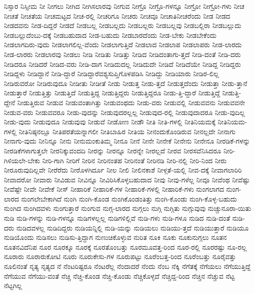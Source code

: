 {ನಿಸ್ಸಾರ
ನಿಸ್ಸೀಮ
ನೀ
ನೀಗಲು
ನೀಗಿದ
ನೀಗಿಸಲಾರವು
ನೀಗುವ
ನೀಗ್ರೊ
ನೀಗ್ರೊ-ಗಳನ್ನೂ
ನೀಗ್ರೋ
ನೀಗ್ರೋ-ಗಳು
ನೀಚ
ನೀಚತೆ
ನೀಚತೆಯ
ನೀಚಮಟ್ಟದ
ನೀಚ-ರಲ್ಲಿ
ನೀಚರಿಗೂ
ನೀಚರು
ನೀಚವೂ
ನೀಚಾತಿನೀಚರೆಂದು
ನೀಡ
ನೀಡದ
ನೀಡದವನು
ನೀಡ-ದಿದ್ದರೆ
ನೀಡದೆ
ನೀಡಬಲ್ಲ
ನೀಡಬಲ್ಲದು
ನೀಡಬಲ್ಲರು
ನೀಡಬಲ್ಲವು
ನೀಡಬಲ್ಲಿರಾ
ನೀಡಬಲ್ಲುದು
ನೀಡಬಲ್ಲುದೆಂಬು-ದಕ್ಕೆ
ನೀಡಬಹುದಾದ
ನೀಡ-ಬಹುದು
ನೀಡಬಾರದೆಂದು
ನೀಡ-ಬೇಕು
ನೀಡಬೇಕೆಂದು
ನೀಡಲಾಗದಿರು-ವುದು
ನೀಡಲಾಗಲಿಲ್ಲ-ವೆಂದು
ನೀಡಲಾಗುತ್ತಿದೆ
ನೀಡಲಾದ
ನೀಡಲಾಪ
ನೀಡಲಾಪರು
ನೀಡ-ಲಾರದು
ನೀಡ-ಲಾರರು
ನೀಡಲಾರವು
ನೀಡಲು
ನೀಡಿ
ನೀಡಿತು
ನೀಡಿತ್ತು
ನೀಡಿದ
ನೀಡಿದಂತಾಗು-ತ್ತದೆ
ನೀಡಿ-ದಂತೆ
ನೀಡಿ-ದರು
ನೀಡಿದರೂ
ನೀಡಿದರೆ
ನೀಡಿದ-ವರು
ನೀಡಿ-ದಾಗ
ನೀಡಿದುದಲ್ಲ
ನೀಡಿದುದೇ
ನೀಡಿದೆ
ನೀಡಿದೆಯೇ
ನೀಡಿದ್ದ
ನೀಡಿದ್ದರು
ನೀಡಿದ್ದಳು
ನೀಡಿದ್ದಾನೆ
ನೀಡಿ-ದ್ದಾರೆ
ನೀಡಿದ್ದಾರೆವಶ್ಯಸುಪ್ತಿಗೊಳಪಡಿಸಿ
ನೀಡಿದ್ದು
ನೀಡಿಯಾರು
ನೀಡಿರ-ಲಿಲ್ಲ
ನೀಡಿರುವರೋ
ನೀಡಿರುವುದೂ
ನೀಡೀತು
ನೀಡೀತೆ
ನೀಡು
ನೀಡುತ್ತ
ನೀಡು-ತ್ತದೆ
ನೀಡುತ್ತದೆಂದು
ನೀಡುತ್ತಾ
ನೀಡು-ತ್ತಾನೆ
ನೀಡುತ್ತಾರೆ
ನೀಡುತ್ತಿತ್ತು
ನೀಡುತ್ತಿದೆ
ನೀಡುತ್ತಿದ್ದ
ನೀಡುತ್ತಿದ್ದರು
ನೀಡುತ್ತಿದ್ದರೂ
ನೀಡು-ತ್ತಿ-ದ್ದಾರೆ
ನೀಡುತ್ತಿದ್ದೆ
ನೀಡುತ್ತಿ-ದ್ದೇನೆ
ನೀಡುತ್ತಿರುವ
ನೀಡುವ
ನೀಡುವಂತಾಗಿತ್ತು
ನೀಡುವಂಥದು
ನೀಡು-ವರು
ನೀಡುವಲ್ಲಿ
ನೀಡುವವನು
ನೀಡುವವನೇ
ನೀಡುವ-ವರು
ನೀಡುವವರೂ
ನೀಡು-ವುದನ್ನು
ನೀಡುವುದರಲ್ಲಲ್ಲ
ನೀಡುವುದ-ರಲ್ಲಿ
ನೀಡುವುದಾದರೂ
ನೀಡು-ವುದಿಲ್ಲ
ನೀಡು-ವುದು
ನೀಡುವುದೂ
ನೀಡುವುವು
ನೀಡುವೆ
ನೀಡೋಣ
ನೀಡೌ
ನೀತಿ
ನೀತಿ-ಗಳಲ್ಲಿ
ನೀತಿನಿಯಮಕ್ಕೆ
ನೀತಿನಿಯಮ-ಗಳಲ್ಲಿ
ನೀತಿನಿಷ್ಠನಲ್ಲೂ
ನೀತಿಪರತೆಯನ್ನಾಗಲೀ
ನೀತಿಬಾಹಿರ
ನೀತಿಯ
ನೀನಂದುಕೊಂಡಿರುವ
ನೀನಲ್ಲದೇ
ನೀನಾಗು
ನೀನಾಗು-ವುದು
ನೀನಿನ್ನೂ
ನೀನು
ನೀನುಮಂಕುತಿಮ್ಮ
ನೀನೂ
ನೀನೆ
ನೀನೇ
ನೀನೇಕೆ
ನೀನೇನು
ನೀನೇನೂ
ನೀರಡಿಕೆ-ಗಳನ್ನು
ನೀರಡಿಕೆಗಳಾಗುತ್ತಲೇ
ನೀರನಿಕ್ಕುವಂದದಿ
ನೀರನ್ನು
ನೀರನ್ನೂ
ನೀರನ್ನೇ
ನೀರಲ್ಲದೆ
ನೀರವ
ನೀರಸವೆನಿಸಿದರೂ
ನೀರಿ-ಗಿಳಿಯಲೇ-ಬೇಕು
ನೀರಿ-ಗಾಗಿ
ನೀರಿಗೆ
ನೀರಿನ
ನೀರಿನಂತಹ
ನೀರಿನಂತೆ
ನೀರಿನಡಿ
ನೀರಿ-ನಲ್ಲಿ
ನೀರಿ-ನಿಂದ
ನೀರು
ನೀರೂರುವುದಿಲ್ಲವೇ
ನೀರೆರೆದು
ನೀರೊಳಗಿರ್ದೂ
ನೀಲ
ನೀಲಿ
ನೀಲಿನಕಾಶೆ
ನೀಳ್ಗತೆ-ಯಲ್ಲಿ
ನೀವ-ದಕ್ಕೆ
ನೀವಾಗಲಾರಿರಿ
ನೀವಾದರೋ
ನೀವಾರು
ನೀವಿಡುವ
ನೀವಿನ್ನೂ
ನೀವಿರಿಸಿಕೊಳ್ಳಬಹುದಾದ
ನೀವು
ನೀವು-ಗಳೆಲ್ಲ
ನೀವೂ
ನೀವೆಂಥ
ನೀವೆಷ್ಟು
ನೀವೆಷ್ಟೇ
ನೀವೇ
ನೀವೇಕೆ
ನೀಸ್
ನೀಹಾರಿಕೆ
ನೀಹಾರಿಕೆ-ಗಳ
ನೀಹಾರಿಕೆ-ಗಳಲ್ಲಿ
ನೀಹಾರಿಕೆ-ಗಳು
ನುಂಗಲಾಗದ
ನುಂಗ-ಲಾರದ
ನುಂಗಲೇಬೇಕಾಗಿದೆ
ನುಂಗಿ
ನುಂಗಿ-ಕೊಂಡ
ನುಂಗಿಕೊಂಡಂತಿತ್ತು
ನುಂಗಿ-ಕೊಂಡು
ನುಂಗಿ-ಕೊಳ್ಳ-ಬಹುದು
ನುಂಗಿದ
ನುಂಗಿದವಳು
ನುಂಗುತ್ತಾರೆ
ನುಂಗುವ
ನುಗ್ಗ-ಲಾರದ
ನುಗ್ಗಲು
ನುಗ್ಗಿ
ನುಗ್ಗಿತು
ನುಗ್ಗುವುವು
ನುಚ್ಚುನೂರಾ-ಯಿತು
ನುಡಿ
ನುಡಿ-ಗಳನ್ನು
ನುಡಿ-ಗಳನ್ನೂ
ನುಡಿಗಳಲ್ಲಲ್ಲ
ನುಡಿಗಳಿಲ್ಲಿವೆ
ನುಡಿ-ಗಳು
ನುಡಿ-ಗಳೂ
ನುಡಿದ
ನುಡಿ-ದಂತೆ
ನುಡಿ-ದರು
ನುಡಿದವಳಲ್ಲ
ನುಡಿದಿದ್ದರು
ನುಡಿಯನ್ನಿಲ್ಲಿ
ನುಡಿ-ಯನ್ನು
ನುಡಿಯಲು
ನುಡಿಯು-ತ್ತದೆ
ನುಡಿಯುತ್ತಾರೆ
ನುಡಿಯೂ
ನುಡಿಯೊಂದು
ನುಡಿಸಲು
ನುಡಿಸು-ತ್ತಿದ್ದಾಗ
ನುಣುಚಿಕೊಳ್ಳುವ
ನುರಿತ
ನೂಕಿ
ನೂಕು
ನೂಕುನುಗ್ಗಲು
ನೂತನ
ನೂತನವಿದೆನಿಪ
ನೂರ
ನೂರಕ್ಕೂ
ನೂರಕ್ಕೆ
ನೂರತೊಂಬತ್ತು
ನೂರಮೂವತ್ತ-ರಿಂದ
ನೂರ-ರಲ್ಲಿ
ನೂರರಷ್ಟು
ನೂ-ರಲ್ಲ
ನೂರಾರು
ನೂರಾರುಕೋಟಿ
ನೂರು
ನೂರುಕೇಸು-ಗಳ
ನೂರುಪಟ್ಟು
ನೂರೆಂಬತ್ತ-ರಿಂದ
ನೂರೆಂಬತ್ತು
ನೂರೈವತ್ತು
ನೂಲಿನಂತೆ
ನೃತ್ಯ
ನೃತ್ಯದ
ನೆ
ನೆಂಟರಿಷ್ಟರೂ
ನೆಂಟರೆಲ್ಲ
ನೆಂದಾದರೆ
ನೆಂದು
ನೆಂಬ
ನೆಕ್ಕಿ
ನೆಗೆತಕ್ಕೆ
ನೆಗೆಯಲು
ನೆಗೆಯುತ್ತಿದ್ದೆ
ನೆಗೆಯುವ
ನೆಗೆಯು-ವಂತೆ
ನೆಚ್ಚಿ
ನೆಚ್ಚಿ-ಕೊಂಡ
ನೆಚ್ಚಿ-ಕೊಂಡು
ನೆಚ್ಚಿಕೊಳ್ಳದೆ
ನೆಚ್ಚಿದ್ದ-ರಿಂದ
ನೆಚ್ಚಿನ
ನೆಚ್ಚುವ
ನೆಟ್ಟ
ನೆಟ್ಟಗಿಲ್ಲ
}

